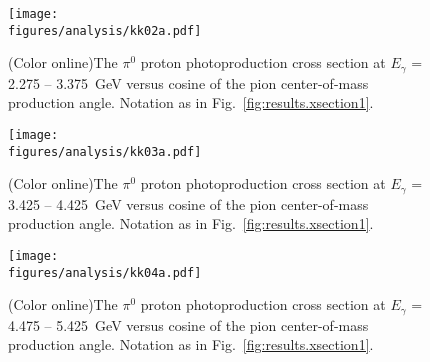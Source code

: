 \begin{figure}[h!]\begin{center}
\texttt{[image: \\figures/analysis/kk02a.pdf]}
\caption[The $\pi^0$ proton photoproduction cross section at $E_{\gamma}$ = 2.275 -- 3.375~GeV versus cosine of the pion center-of-mass production angle]{\label{fig:results.xsection2}(Color online)The $\pi^0$ proton photoproduction cross section at $E_{\gamma}$ = 2.275 -- 3.375~GeV versus cosine of the pion center-of-mass production angle. Notation as in Fig.~\protect\ref{fig:results.xsection1}.}
\end{center}\end{figure}

\begin{figure}[h!]\begin{center}
\texttt{[image: \\figures/analysis/kk03a.pdf]}
\caption[The $\pi^0$ proton photoproduction cross section at $E_{\gamma}$ = 3.425 -- 4.425~GeV versus cosine of the pion center-of-mass production angle]{\label{fig:results.xsection3}(Color online)The $\pi^0$ proton photoproduction cross section at $E_{\gamma}$ = 3.425 -- 4.425~GeV versus cosine of the pion center-of-mass production angle. Notation as in Fig.~\protect\ref{fig:results.xsection1}.}
\end{center}\end{figure}

\begin{figure}[h!]\begin{center}
\texttt{[image: \\figures/analysis/kk04a.pdf]}
\caption[The $\pi^0$ proton photoproduction cross section at $E_{\gamma}$ = 4.475 -- 5.425~GeV versus cosine of the pion center-of-mass production angle]{\label{fig:results.xsection4}(Color online)The $\pi^0$ proton photoproduction cross section at $E_{\gamma}$ = 4.475 -- 5.425~GeV versus cosine of the pion center-of-mass production angle. Notation as in Fig.~\protect\ref{fig:results.xsection1}.}
\end{center}\end{figure}
\FloatBarrier
